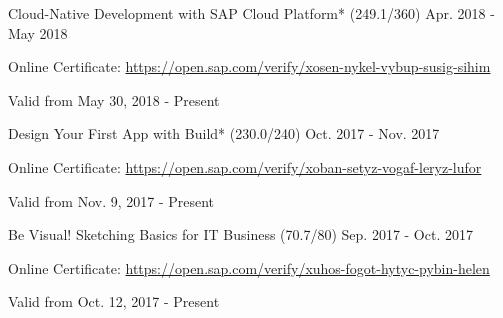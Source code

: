 \begin{cventries}
  \cventry
    {Cloud-Native Development with SAP Cloud Platform* (249.1/360)} %
    {} %
    {} %
    {Apr. 2018 - May 2018} %
    {
	    \begin{cvitems} %
        \item[] {Online Certificate: \url{https://open.sap.com/verify/xosen-nykel-vybup-susig-sihim}} %
        \item[] {Valid from May 30, 2018 - Present} %
      \end{cvitems}
    }   
    \vspace{-0.1cm}
  \cventry
    {Design Your First App with Build* (230.0/240)} %
    {} %
    {} %
    {Oct. 2017 - Nov. 2017} %
    {
	    \begin{cvitems} %
        \item[] {Online Certificate: \url{https://open.sap.com/verify/xoban-setyz-vogaf-leryz-lufor}} %
        \item[] {Valid from Nov. 9, 2017 - Present} %
      \end{cvitems}
    }      
    \vspace{-0.1cm}
  \cventry
    {Be Visual! Sketching Basics for IT Business (70.7/80)} %
    {} %
    {} %
    {Sep. 2017 - Oct. 2017} %
    {
	    \begin{cvitems} %
        \item[] {Online Certificate: \url{https://open.sap.com/verify/xuhos-fogot-hytyc-pybin-helen}} %
        \item[] {Valid from Oct. 12, 2017 - Present} %
      \end{cvitems}
    }      
    \vspace{-0.1cm}

\end{cventries}
